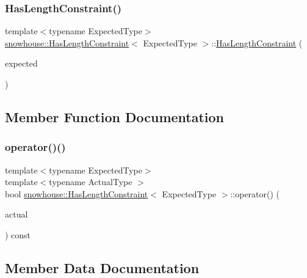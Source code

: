 \subsubsection{\texorpdfstring{HasLengthConstraint()}{HasLengthConstraint()}}
{\footnotesize\ttfamily template$<$typename Expected\+Type$>$ \\
\mbox{\hyperlink{structsnowhouse_1_1HasLengthConstraint}{snowhouse\+::\+Has\+Length\+Constraint}}$<$ Expected\+Type $>$\+::\mbox{\hyperlink{structsnowhouse_1_1HasLengthConstraint}{Has\+Length\+Constraint}} (\begin{DoxyParamCaption}\item[{const Expected\+Type \&}]{expected }\end{DoxyParamCaption})\hspace{0.3cm}{\ttfamily [inline]}}



\subsection{Member Function Documentation}
\mbox{\label{structsnowhouse_1_1HasLengthConstraint_aacbc852671aa3d039b41e150e3269b69}} 
\subsubsection{\texorpdfstring{operator()()}{operator()()}}
{\footnotesize\ttfamily template$<$typename Expected\+Type$>$ \\
template$<$typename Actual\+Type $>$ \\
bool \mbox{\hyperlink{structsnowhouse_1_1HasLengthConstraint}{snowhouse\+::\+Has\+Length\+Constraint}}$<$ Expected\+Type $>$\+::operator() (\begin{DoxyParamCaption}\item[{const Actual\+Type \&}]{actual }\end{DoxyParamCaption}) const\hspace{0.3cm}{\ttfamily [inline]}}



\subsection{Member Data Documentation}
\mbox{\label{structsnowhouse_1_1HasLengthConstraint_a7e4330a1c135acd8a9fb3dbcc819fb59}} 
